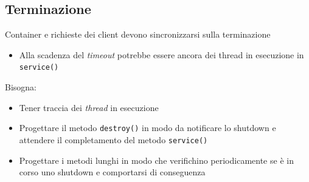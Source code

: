 \subsection{Terminazione}
Container e richieste dei client devono sincronizzarsi sulla terminazione
\begin{itemize}
    \item Alla scadenza del \textit{timeout} potrebbe essere ancora dei thread in esecuzione in \verb#service()#
\end{itemize}
Bisogna:
\begin{itemize}
    \item Tener traccia dei \textit{thread} in esecuzione
    \item Progettare il metodo \verb#destroy()# in modo da notificare lo shutdown e attendere il completamento del metodo \verb#service()#
    \item Progettare i metodi lunghi in modo che verifichino periodicamente se è in corso uno shutdown e comportarsi di conseguenza
\end{itemize}

